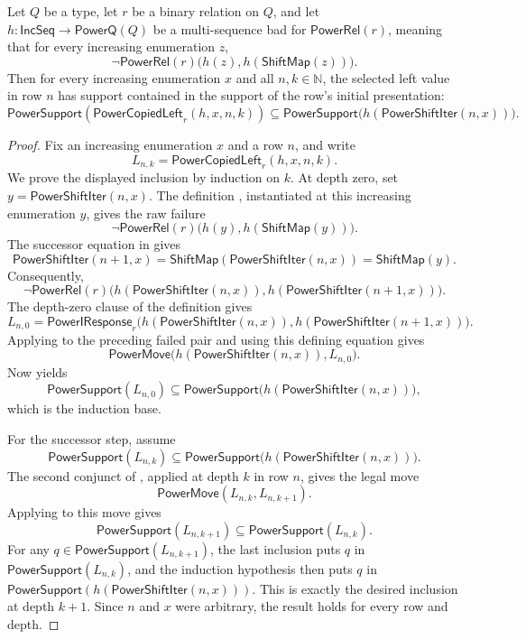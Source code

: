 \begin{lemma}
Let $Q$ be a type, let $r$ be a binary relation on $Q$, and let
$h:\mathsf{IncSeq}\to\mathsf{PowerQ}(Q)$ be a multi-sequence bad for
$\mathsf{PowerRel}(r)$, meaning that for every increasing enumeration $z$,
\[
\neg\mathsf{PowerRel}(r)\bigl(h(z),h(\mathsf{ShiftMap}(z))\bigr).
\]
Then for every increasing enumeration $x$ and all $n,k\in\mathbb N$, the
selected left value in row $n$ has support contained in the support of the
row's initial presentation:
\[
\mathsf{PowerSupport}(\mathsf{PowerCopiedLeft}_r(h,x,n,k))
\subseteq
\mathsf{PowerSupport}\bigl(h(\mathsf{PowerShiftIter}(n,x))\bigr).
\]
\end{lemma}
\begin{proof}
Fix an increasing enumeration $x$ and a row $n$, and write
\[
L_{n,k}=\mathsf{PowerCopiedLeft}_r(h,x,n,k).
\]
We prove the displayed inclusion by induction on $k$.  At depth zero,
set $y=\mathsf{PowerShiftIter}(n,x)$.  The definition
, instantiated at this increasing enumeration $y$,
gives the raw failure
\[
\neg\mathsf{PowerRel}(r)\bigl(h(y),h(\mathsf{ShiftMap}(y))\bigr).
\]
The successor equation in  gives
\[
\mathsf{PowerShiftIter}(n+1,x)=\mathsf{ShiftMap}(\mathsf{PowerShiftIter}(n,x))
  =\mathsf{ShiftMap}(y).
\]
Consequently,
\[
\neg\mathsf{PowerRel}(r)\bigl(
 h(\mathsf{PowerShiftIter}(n,x)),
 h(\mathsf{PowerShiftIter}(n+1,x))\bigr).
\]
The depth-zero clause of the definition  gives
\[
L_{n,0}=\mathsf{PowerIResponse}_r\bigl(
  h(\mathsf{PowerShiftIter}(n,x)),
  h(\mathsf{PowerShiftIter}(n+1,x))\bigr).
\]
Applying  to the preceding failed pair and
using this defining equation gives
\[
\mathsf{PowerMove}\bigl(h(\mathsf{PowerShiftIter}(n,x)),L_{n,0}\bigr).
\]
Now  yields
\[
\mathsf{PowerSupport}(L_{n,0})
\subseteq
\mathsf{PowerSupport}\bigl(h(\mathsf{PowerShiftIter}(n,x))\bigr),
\]
which is the induction base.

For the successor step, assume
\[
\mathsf{PowerSupport}(L_{n,k})
\subseteq
\mathsf{PowerSupport}\bigl(h(\mathsf{PowerShiftIter}(n,x))\bigr).
\]
The second conjunct of , applied at depth
$k$ in row $n$, gives the legal move
\[
\mathsf{PowerMove}(L_{n,k},L_{n,k+1}).
\]
Applying  to this move gives
\[
\mathsf{PowerSupport}(L_{n,k+1})
\subseteq \mathsf{PowerSupport}(L_{n,k}).
\]
For any $q\in\mathsf{PowerSupport}(L_{n,k+1})$, the last inclusion puts $q$
in $\mathsf{PowerSupport}(L_{n,k})$, and the induction hypothesis then puts
$q$ in
$\mathsf{PowerSupport}(h(\mathsf{PowerShiftIter}(n,x)))$.  This is exactly
the desired inclusion at depth $k+1$.  Since $n$ and $x$ were arbitrary, the
result holds for every row and depth.
\end{proof}
